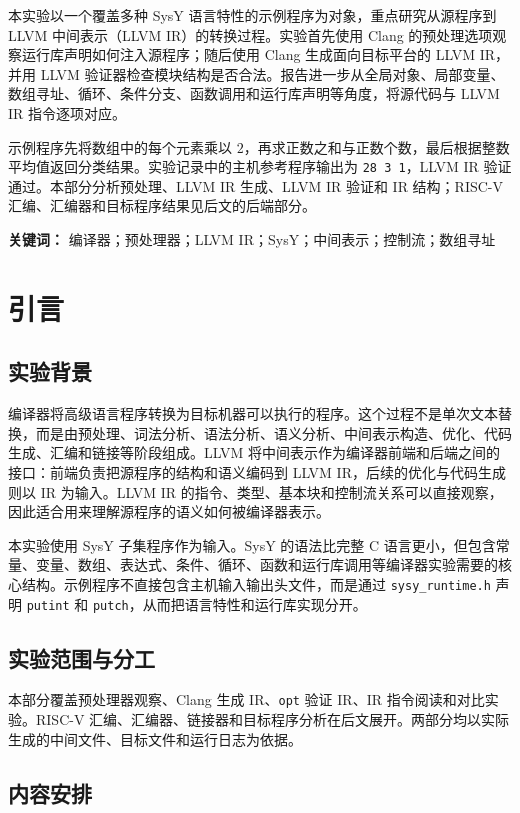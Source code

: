 \documentclass[a4paper]{article}
\begin{document}
本实验以一个覆盖多种 SysY 语言特性的示例程序为对象，重点研究从源程序到 LLVM 中间表示（LLVM IR）的转换过程。实验首先使用 Clang 的预处理选项观察运行库声明如何注入源程序；随后使用 Clang 生成面向目标平台的 LLVM IR，并用 LLVM 验证器检查模块结构是否合法。报告进一步从全局对象、局部变量、数组寻址、循环、条件分支、函数调用和运行库声明等角度，将源代码与 LLVM IR 指令逐项对应。

示例程序先将数组中的每个元素乘以 $2$，再求正数之和与正数个数，最后根据整数平均值返回分类结果。实验记录中的主机参考程序输出为 \texttt{28 3 1}，LLVM IR 验证通过。本部分分析预处理、LLVM IR 生成、LLVM IR 验证和 IR 结构；RISC-V 汇编、汇编器和目标程序结果见后文的后端部分。

\noindent\textbf{关键词：} 编译器；预处理器；LLVM IR；SysY；中间表示；控制流；数组寻址

\section{引言}

\subsection{实验背景}

编译器将高级语言程序转换为目标机器可以执行的程序。这个过程不是单次文本替换，而是由预处理、词法分析、语法分析、语义分析、中间表示构造、优化、代码生成、汇编和链接等阶段组成。LLVM 将中间表示作为编译器前端和后端之间的接口：前端负责把源程序的结构和语义编码到 LLVM IR，后续的优化与代码生成则以 IR 为输入。LLVM IR 的指令、类型、基本块和控制流关系可以直接观察，因此适合用来理解源程序的语义如何被编译器表示\cite{llvmLangRef,clangCommandGuide}。

本实验使用 SysY 子集程序作为输入。SysY 的语法比完整 C 语言更小，但包含常量、变量、数组、表达式、条件、循环、函数和运行库调用等编译器实验需要的核心结构\cite{sysy2022}。示例程序不直接包含主机输入输出头文件，而是通过 \texttt{sysy\_runtime.h} 声明 \texttt{putint} 和 \texttt{putch}，从而把语言特性和运行库实现分开。

\subsection{实验范围与分工}

本部分覆盖预处理器观察、Clang 生成 IR、\texttt{opt} 验证 IR、IR 指令阅读和对比实验。RISC-V 汇编、汇编器、链接器和目标程序分析在后文展开。两部分均以实际生成的中间文件、目标文件和运行日志为依据。

\subsection{内容安排}
\end{document}

